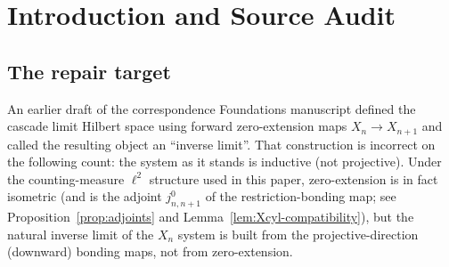 \documentclass[11pt, a4paper]{amsart}
\theoremstyle{definition}
\newcommand{\Q}{\mathbb{Q}}
\newcommand{\inv}{\mathrm{inv}}
\newcommand{\cyl}{\mathrm{cyl}}
\begin{document}
\begin{abstract}
The main theorems proved in this paper:
(1) Proposition~\ref{prop:refinement-equivariant}, the refinement
rule with $V_n \subset V_{n+1}$ inclusion is well-defined and
Coxeter-equivariant;
(2) Proposition~\ref{prop:Xn-Hilbert}, each finite-level $X_n^0,
X_n^1$ is a finite-dimensional Hilbert space;
(3) Theorem~\ref{thm:bonding}, downward bonding maps are
contractions under counting measure;
(4) Proposition~\ref{prop:adjoints}, the cylindrical embeddings
$j_{n, n+1}$ are the adjoints of the bonding maps;
(5) Theorem~\ref{thm:Xcyl-direct-limit}, the vertex algebraic
direct limit $X_\cyl^{0, \bullet}$ is well-defined as
$c_{00}(V_\infty^\bullet; F^0)$;
(6) Theorem~\ref{thm:Xinv-Hilbert}, the vertex inverse limit
$X_\inv^{0, \bullet}$ under restriction is canonically isometric
to $\ell^2(V_\infty^\bullet; F^0)$ and is a separable Hilbert space;
(7) Proposition~\ref{prop:Xcyl-dense}, $X_\cyl^{0, \bullet}$
embeds densely in $X_\inv^{0, \bullet}$;
(8) Theorem~\ref{thm:commute}, the finite-level vertex Coxeter
intertwinings $g \circ p_{n+1, n}^0 = p_{n+1, n}^0 \circ g$ and
$g \circ j_{n, n+1}^0 = j_{n, n+1}^0 \circ g$ (which descend to
$X_\cyl^{0, \bullet}$ and $X_\inv^{0, \bullet}$), the
finite-level edge Coxeter intertwinings for $p^1$ and $j^1$, and
the mixed-form vertex-sector $\sigma$ intertwinings for $p^0$ and
$j^0$ on $X_n^{0, \bullet}|_{\Q(\varphi)/\Q}$ (using $\sigma$
from P1).

These are the intended load-bearing inputs for the closure-dynamics paper P4,
the metric projection paper P5, and the gauge/arithmetic/computation
branch papers P9--P13, as well as for the correspondence Foundations
paper.
\end{abstract}

\tableofcontents

\section{Introduction and Source Audit}
\label{sec:intro}

\subsection{The repair target}

An earlier draft of the correspondence Foundations manuscript
defined the cascade limit Hilbert space using forward zero-extension
maps $X_n \to X_{n+1}$ and called the resulting object an
``inverse limit''. That construction is incorrect on the following
count: the system as it stands is inductive (not projective).
Under the counting-measure $\ell^2$ structure used in this paper,
zero-extension is in fact isometric (and is the adjoint
$j_{n, n+1}^0$ of the restriction-bonding map; see
Proposition~\ref{prop:adjoints} and Lemma~\ref{lem:Xcyl-compatibility}),
but the natural inverse limit of the $X_n$ system is built from
the projective-direction (downward) bonding maps, not from
zero-extension.
\end{document}
